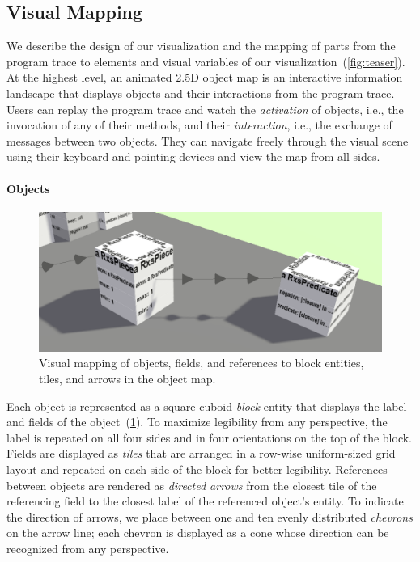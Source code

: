 \subsection{Visual Mapping}
\label{sec:visualization_approach/mapping}

We describe the design of our visualization and the mapping of parts from the program trace to elements and visual variables of our visualization~(\cref{fig:teaser}).
At the highest level, an animated 2.5D object map is an interactive information landscape that displays objects and their interactions from the program trace.
Users can replay the program trace and watch the \emph{activation} of objects, i.e., the invocation of any of their methods, and their \emph{interaction}, i.e., the exchange of messages between two objects.
They can navigate freely through the visual scene using their keyboard and pointing devices and view the map from all sides.

\paragraph{Objects}
\label{sec:visualization_approach/mapping/objects}

\begin{figure}
	\includegraphics[width=\linewidth]{sections/03_visualization_approach/mapping/objects}
	\caption{Visual mapping of objects, fields, and references to block entities, tiles, and arrows in the object map.}
	\label{fig:visualization_approach/mapping/objects}
\end{figure}

Each object is represented as a square cuboid \emph{block} entity that displays the label and fields of the object~(\cref{fig:visualization_approach/mapping/objects}).
To maximize legibility from any perspective, the label is repeated on all four sides and in four orientations on the top of the block.
Fields are displayed as \emph{tiles} that are arranged in a row-wise uniform-sized grid layout and repeated on each side of the block for better legibility.
References between objects are rendered as \emph{directed arrows} from the closest tile of the referencing field to the closest label of the referenced object's entity.
To indicate the direction of arrows, we place between one and ten evenly distributed \emph{chevrons} on the arrow line; each chevron is displayed as a cone whose direction can be recognized from any perspective.

